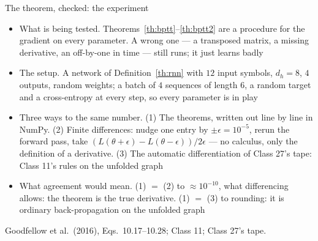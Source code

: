 \documentclass[aspectratio=169, 11pt]{beamer}
\newcommand{\srcline}[1]{%
  \par\vspace{0.25em}%
  {\scriptsize\color{mcMuted}\hfill #1\par}}
\newcommand{\src}[3]{}      %
\begin{document}
\begin{frame}{The theorem, checked: the experiment}
  \src{goodfellow2016}{equation}{10.17-10.28}
  \src{goodfellow2016}{section}{10.2.2}
  \vspace{-0.15em}
  {\footnotesize
  \begin{itemize}\itemsep0.28em
    \item \alert{What is being tested.} Theorems~\ref{th:bptt}--\ref{th:bptt2}
          are a procedure for the gradient on every parameter. A wrong one
          --- a transposed matrix, a missing derivative, an off-by-one in
          time --- still runs; it just learns badly
    \item \alert{The setup.} A network of Definition~\ref{th:rnn} with
          $12$ input symbols, $d_h = 8$, $4$ outputs, random weights; a
          batch of $4$ sequences of length $6$, a random target and a
          cross-entropy at every step, so every parameter is in play
    \item \alert{Three ways to the same number.} (1) The theorems, written
          out line by line in NumPy. (2) \alert{Finite differences}: nudge one
          entry by $\pm\epsilon = 10^{-5}$, rerun the forward pass, take
          $(L(\theta + \epsilon) - L(\theta - \epsilon))/2\epsilon$ --- no
          calculus, only the definition of a derivative. (3) The automatic
          differentiation of Class 27's tape: Class 11's rules on the
          unfolded graph
    \item \alert{What agreement would mean.} (1) $=$ (2) to $\approx 10^{-10}$,
          what differencing allows: the theorem is the true derivative.
          (1) $=$ (3) to rounding: it is ordinary back-propagation on the
          unfolded graph
  \end{itemize}}
  \srcline{Goodfellow et al.\ (2016), Eqs.~10.17--10.28; Class 11; Class 27's tape.}
\end{frame}
\end{document}
